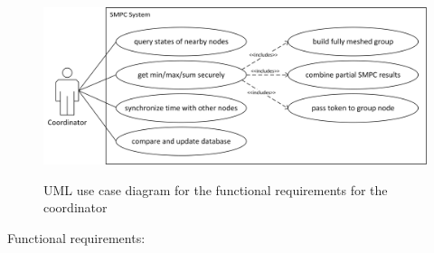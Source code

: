 	\begin{figure}[!htb] %
	\caption{\gls{UML} use case diagram for the functional requirements for the coordinator}
	\includegraphics[scale=0.75]{figures/use-case-coordinator.png}
	\label{figure:requirements use case coordinator}
	\end{figure}

	Functional requirements:


